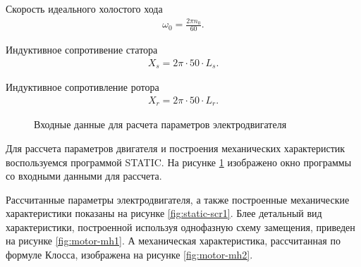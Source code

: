         Скорость идеального холостого хода
        \begin{gather*}
            \omega_0 = \frac{2\pi n_0}{60}.
        \end{gather*}

        Индуктивное сопротивение статора
        \begin{gather*}
            X_s = 2\pi \cdot 50 \cdot L_s.
        \end{gather*}
        
        Индуктивное сопротивление ротора
        \begin{gather*}
            X_r = 2\pi \cdot 50 \cdot L_r.
        \end{gather*}

        \begin{figure}[h!]
            \caption{Входные данные для расчета параметров электродвигателя}
            \label{fig:static-scr2}
        \end{figure}       

        Для рассчета параметров двигателя и построения механических характеристик воспользуемся программой STATIC. 
        На рисунке \ref{fig:static-scr2} изображено окно программы со входными данными для рассчета.

        Рассчитанные параметры электродвигателя, а также построенные
        механические характеристики показаны на рисунке \ref{fig:static-scr1}.
        Блее детальный вид характеристики, построенной используя однофазную
        схему замещения, приведен на рисунке \ref{fig:motor-mh1}.  А
        механическая характеристика, рассчитанная по формуле Клосса, изображена
        на рисунке \ref{fig:motor-mh2}.

